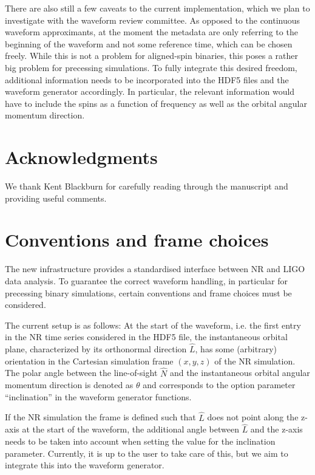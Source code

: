 \documentclass[aps,prd,amssymb,amsmath,amsfonts,superscriptaddress,
floatfix ,preprintnumbers,altaffilletter]{revtex4}
\begin{document}
There are also still a few caveats to the current implementation, which we plan to investigate with the waveform review committee.
As opposed to the continuous waveform approximants, at the moment the metadata
are only referring to the beginning of the waveform and not some reference time, which can be chosen freely. While this is 
not a problem for aligned-spin binaries, this poses a rather big problem for precessing simulations. To fully integrate this
desired freedom, additional information needs to be incorporated into the HDF5 files and the waveform generator
accordingly. In particular, the relevant information would have to include the spins as a function of frequency as well
as the orbital angular momentum direction. 

\section*{Acknowledgments}
We thank Kent Blackburn for carefully reading through the manuscript and providing useful comments.

\appendix
\section{Conventions and frame choices}
\label{sec:conv}
The new infrastructure provides a standardised interface between NR and LIGO data analysis. To guarantee
the correct waveform handling, in particular for precessing binary simulations, certain conventions and frame
choices must be considered. 

The current setup is as follows: At the start of the waveform, i.e. the first entry in the NR time series considered in the
HDF5 file, the instantaneous orbital plane, characterized by its orthonormal direction $\hat{L}$, has some (arbitrary) orientation
in the Cartesian simulation frame $(x, y, z)$ of the NR simulation. The polar angle between the line-of-sight $\hat{N}$ and the instantaneous orbital angular momentum direction is denoted as $\theta$ and corresponds to the option parameter ``inclination'' in the waveform generator functions. 

If the NR simulation the frame is defined such that $\hat{L}$ does not point along the z-axis at the start of the waveform, the additional angle between $\hat{L}$ and the z-axis needs to be taken into account when setting the value for the inclination parameter. Currently, it is up to the user to take care of this, but we aim to integrate this into the waveform generator. 
\end{document}
